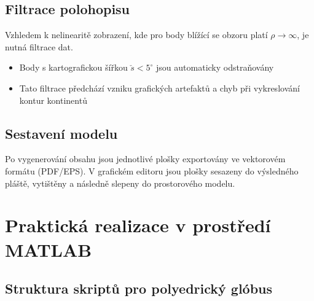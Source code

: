 \documentclass[12pt, a4paper]{article}
\begin{document}
\subsection{Filtrace polohopisu}
Vzhledem k nelinearitě zobrazení, kde pro body blížící se obzoru platí $\rho \to \infty$, je nutná filtrace dat.
\begin{itemize}
    \item Body s kartografickou šířkou $\check{s} < 5^\circ$ jsou automaticky odstraňovány 
    \item Tato filtrace předchází vzniku grafických artefaktů a chyb při vykreslování kontur kontinentů 
\end{itemize}

\subsection{Sestavení modelu}
Po vygenerování obsahu jsou jednotlivé plošky exportovány ve vektorovém formátu (PDF/EPS). V grafickém editoru jsou plošky sesazeny do výsledného pláště, vytištěny a následně slepeny do prostorového modelu. 

\clearpage
\newpage

\section{Praktická realizace v prostředí MATLAB}

\subsection{Struktura skriptů pro polyedrický glóbus}
\end{document}
